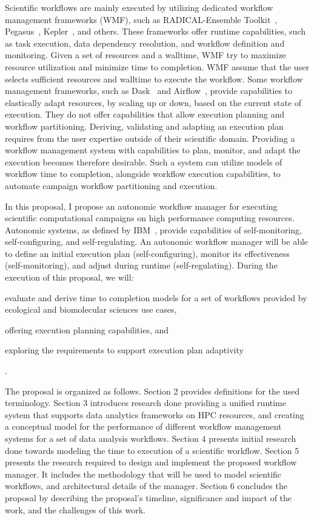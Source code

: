 Scientific workflows are mainly executed by utilizing dedicated workflow 
management frameworks (WMF), such as RADICAL-Ensemble 
Toolkit~\cite{balasubramanian2018harnessing}, Pegasus~\cite{deelman2015pegasus}, 
Kepler~\cite{ludascher2006concurrency}, and others. These frameworks offer 
runtime capabilities, such as task execution, data dependency resolution, and 
workflow definition and monitoring. Given a set of resources and a walltime, 
WMF try to maximize resource utilization and minimize time to completion. WMF 
assume that the user selects sufficient resources and walltime to execute the 
workflow. Some workflow management frameworks, such as 
Dask~\cite{rocklin2015dask} and Airflow~\cite{airflow}, provide capabilities to 
elastically adapt resources, by scaling up or down, based on the current state 
of execution. They do not offer capabilities that allow execution planning and 
workflow partitioning. Deriving, validating and adapting an execution plan 
requires from the user expertise outside of their scientific domain. Providing 
a workflow management system with capabilities to plan, monitor, and adapt the 
execution becomes therefore desirable. Such a system can utilize models of 
workflow time to completion, alongside workflow execution capabilities, to 
automate campaign workflow partitioning and execution.

In this proposal, I propose an autonomic workflow manager for executing 
scientific computational campaigns on high performance computing resources. 
Autonomic systems, as defined by IBM~\cite{ibm2005autonomic}, provide 
capabilities of self-monitoring, self-configuring, and self-regulating. An 
autonomic workflow manager will be able to define an initial execution plan 
(self-configuring), monitor its effectiveness (self-monitoring), and adjust 
during runtime (self-regulating). During the execution of this proposal, we 
will:
\begin{inparaenum}[1)]
\item evaluate and derive time to completion models for a set of workflows 
provided by ecological and biomolecular sciences use cases,
\item offering execution planning capabilities, and 
\item exploring the requirements to support execution plan adaptivity
\end{inparaenum}.

The proposal is organized as follows. Section 2 provides definitions for the 
used terminology. Section 3 introduces research done providing a unified 
runtime system that supports data analytics frameworks on HPC resources, and 
creating a conceptual model for the performance of different workflow management 
systems for a set of data analysis workflows. Section 4 presents initial research 
done towards modeling the time to execution of a scientific workflow. Section 5 
presents the research required to design and implement the proposed workflow 
manager. It includes the methodology that will be used to model scientific 
workflows, and architectural details of the manager. Section 6 concludes the 
proposal by describing the proposal's timeline, significance and impact of the 
work, and the challenges of this work.